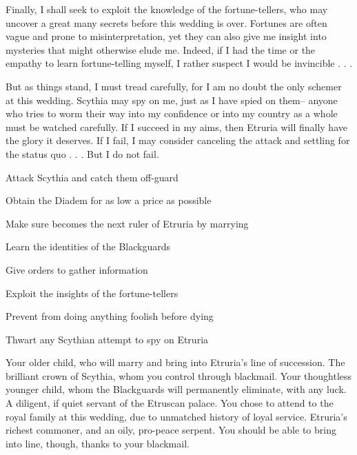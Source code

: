 \documentclass[char]{Kos}
\begin{document}
Finally, I shall seek to exploit the knowledge of the fortune-tellers, who may uncover a great many secrets before this wedding is over. Fortunes are often vague and prone to misinterpretation, yet they can also give me insight into mysteries that might otherwise elude me. Indeed, if I had the time or the empathy to learn fortune-telling myself, I rather suspect I would be invincible . . .

But as things stand, I must tread carefully, for I am no doubt the only schemer at this wedding. Scythia may spy on me, just as I have spied on them-- anyone who tries to worm their way into my confidence or into my country as a whole must be watched carefully. If I succeed in my aims, then Etruria will finally have the glory it deserves. If I fail, I may consider canceling the attack and settling for the status quo . . . But I do not fail.

\begin{itemz}[Goals]
 \item Attack Scythia and catch them off-guard
 \item Obtain the Diadem for as low a price as possible
 \item Make sure \cBride{} becomes the next ruler of Etruria by marrying \cGroom{}
 \item Learn the identities of the Blackguards
 \item Give \cBride{} orders to gather information
 \item Exploit the insights of the fortune-tellers
 \item Prevent \cPoet{} from doing anything foolish before dying
 \item Thwart any Scythian attempt to spy on Etruria
\end{itemz}

\begin{contacts}
\contact{\cGroom{}} Your older child, who will marry \cBride{} and bring \cBride{} into Etruria's line of succession.
\contact{\cBride{}} The brilliant crown \cBride{\prince} of Scythia, whom you control through blackmail.
\contact{\cPoet{}} Your thoughtless younger child, whom the Blackguards will permanently eliminate, with any luck.
\contact{\cAssassin{}} A diligent, if quiet servant of the Etruscan palace. You chose \cAssassin{\them} to attend to the royal family at this wedding, due to \cAssassin{\their} unmatched history of loyal service.
\contact{\cMerchant{}} Etruria's richest commoner, and an oily, pro-peace serpent. You should be able to bring \cMerchant{\them} into line, though, thanks to your blackmail.
\end{contacts} 
\end{document}
